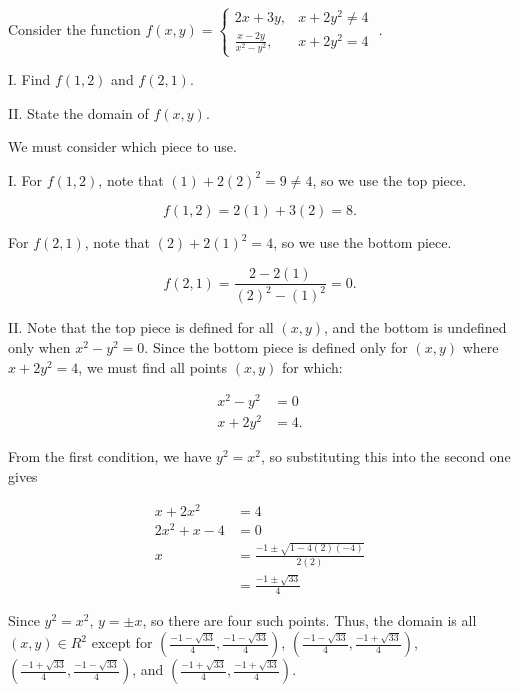 \documentclass[noauthor]{ximera}
\begin{document}

\begin{problem}
Consider the function $f(x,y) =  \begin{cases} 2x+3y , & x+2y^2 \neq 4 \\ \frac{x-2y}{x^2-y^2} , & x+2y^2=4 \end{cases} $ . 

I. Find $f(1,2)$ and $f(2,1)$.

II. State the domain of $f(x,y)$.

\begin{freeResponse}
We must consider which piece to use.

I. For $f(1,2)$, note that $(1)+2(2)^2 = 9 \neq 4$, so we use the top piece.

\[
f(1,2) =2(1)+3(2) =8.
\]

For $f(2,1)$, note that $(2)+2(1)^2 = 4$, so we use the bottom piece.

\[
f(2,1) = \frac{2-2(1)}{(2)^2-(1)^2} = 0.
\]

II. Note that the top piece is defined for all $(x,y)$, and the bottom is undefined only when $x^2-y^2=0$.  Since the bottom piece is defined only for $(x,y)$ where $x+2y^2=4$, we must find all points $(x,y)$ for which:

\begin{align}
x^2-y^2&=0 \\
x+2y^2&=4.
\end{align}

From the first condition, we have $y^2=x^2$, so substituting this into the second one gives

\begin{align*}
x+2x^2 &=4 \\
2x^2+x-4 &= 0 \\
x &= \frac{-1\pm \sqrt{1-4(2)(-4)}}{2(2)} \\
&=\frac{-1\pm \sqrt{33}}{4} 
\end{align*}

Since $y^2=x^2$, $y= \pm x$, so there are four such points.  Thus, the domain is all $(x,y) \in R^2$ except for  $\left(\frac{-1 - \sqrt{33}}{4},\frac{-1- \sqrt{33}}{4} \right)$, $\left(\frac{-1 - \sqrt{33}}{4},\frac{-1 + \sqrt{33}}{4} \right)$, $\left(\frac{-1 + \sqrt{33}}{4},\frac{-1 - \sqrt{33}}{4} \right)$, and $\left(\frac{-1 + \sqrt{33}}{4},\frac{-1 + \sqrt{33}}{4} \right)$.

\end{freeResponse}
\end{problem}
\end{document}
